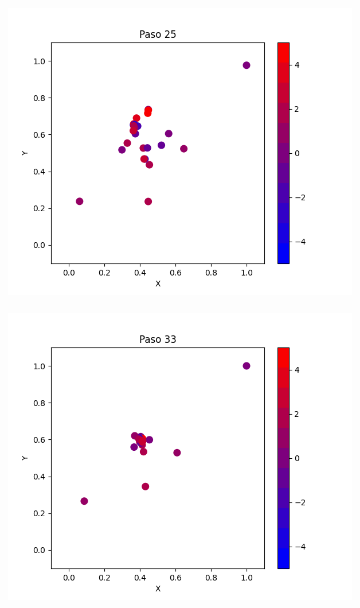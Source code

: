 \documentclass{report}
\begin{document}
\begin{figure}[h]
\begin{subfigure}[b]{0.3\textwidth}
         \centering
         \includegraphics[width=\textwidth]{Images/Images_c/p9pc_t25.png}
     \end{subfigure}
     \begin{subfigure}[b]{0.3\textwidth}
         \centering
         \includegraphics[width=\textwidth]{Images/Images_c/p9pc_t33.png}
     \end{subfigure}
          \begin{subfigure}[b]{0.3\textwidth}
         \centering

\end{subfigure}
\end{figure}
\end{document}
